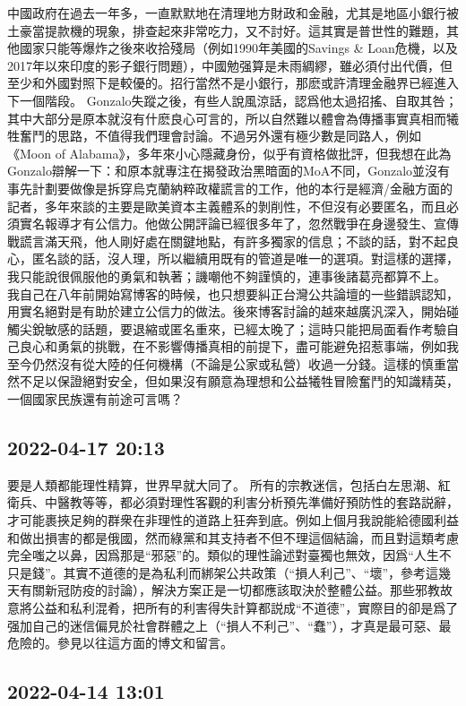 \documentclass[twocolumn]{ctexart}
\begin{document}
中國政府在過去一年多，一直默默地在清理地方財政和金融，尤其是地區小銀行被土豪當提款機的現象，排查起來非常吃力，又不討好。這其實是普世性的難題，其他國家只能等爆炸之後來收拾殘局（例如1990年美國的Savings \& Loan危機，以及2017年以來印度的影子銀行問題），中國勉强算是未雨綢繆，雖必須付出代價，但至少和外國對照下是較優的。招行當然不是小銀行，那麽或許清理金融界已經進入下一個階段。
Gonzalo失蹤之後，有些人說風涼話，認爲他太過招搖、自取其咎；其中大部分是原本就沒有什麽良心可言的，所以自然難以體會為傳播事實真相而犧牲奮鬥的思路，不值得我們理會討論。不過另外還有極少數是同路人，例如《Moon of Alabama》，多年來小心隱藏身份，似乎有資格做批評，但我想在此為Gonzalo辯解一下：和原本就專注在揭發政治黑暗面的MoA不同，Gonzalo並沒有事先計劃要做像是拆穿烏克蘭納粹政權謊言的工作，他的本行是經濟/金融方面的記者，多年來談的主要是歐美資本主義體系的剝削性，不但沒有必要匿名，而且必須實名報導才有公信力。他做公開評論已經很多年了，忽然戰爭在身邊發生、宣傳戰謊言滿天飛，他人剛好處在關鍵地點，有許多獨家的信息；不談的話，對不起良心，匿名談的話，沒人理，所以繼續用既有的管道是唯一的選項。對這樣的選擇，我只能說很佩服他的勇氣和執著；譏嘲他不夠謹慎的，連事後諸葛亮都算不上。
我自己在八年前開始寫博客的時候，也只想要糾正台灣公共論壇的一些錯誤認知，用實名絕對是有助於建立公信力的做法。後來博客討論的越來越廣汎深入，開始碰觸尖銳敏感的話題，要退縮或匿名重來，已經太晚了；這時只能把局面看作考驗自己良心和勇氣的挑戰，在不影響傳播真相的前提下，盡可能避免招惹事端，例如我至今仍然沒有從大陸的任何機構（不論是公家或私營）收過一分錢。這樣的慎重當然不足以保證絕對安全，但如果沒有願意為理想和公益犧牲冒險奮鬥的知識精英，一個國家民族還有前途可言嗎？
\subsection*{2022-04-17 20:13}

要是人類都能理性精算，世界早就大同了。 所有的宗教迷信，包括白左思潮、紅衛兵、中醫教等等，都必須對理性客觀的利害分析預先準備好預防性的套路説辭，才可能裹挾足夠的群衆在非理性的道路上狂奔到底。例如上個月我說能給德國利益和做出損害的都是俄國，然而綠黨和其支持者不但不理這個結論，而且對這類考慮完全嗤之以鼻，因爲那是“邪惡”的。類似的理性論述對臺獨也無效，因爲“人生不只是錢”。其實不道德的是為私利而綁架公共政策（“損人利己”、“壞”，參考這幾天有關新冠防疫的討論），解決方案正是一切都應該取決於整體公益。那些邪教故意將公益和私利混肴，把所有的利害得失計算都説成“不道德”，實際目的卻是爲了强加自己的迷信偏見於社會群體之上（“損人不利己”、“蠢”），才真是最可惡、最危險的。參見以往這方面的博文和留言。
\subsection*{2022-04-14 13:01}
\end{document}
